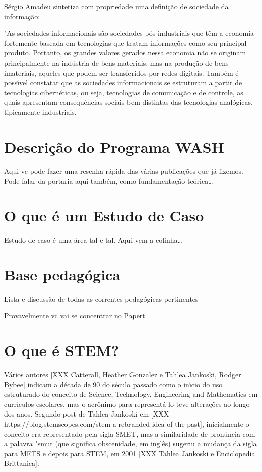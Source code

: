 \documentclass[
12pt,		%
openright,	%
twoside,  %
a4paper,			%
chapter=TITLE,		%
english,			%
french,				%
spanish,			%
brazil				%
]{USPSC-classe/USPSC}
\begin{document}
S\'ergio Amadeu sintetiza com propriedade uma defini\c{c}\~ao de sociedade da informa\c{c}\~ao: 




"As sociedades informacionais s\~ao sociedades p\'os-industriais que t\^em a economia fortemente baseada em tecnologias que tratam informa\c{c}\~oes como seu principal produto. Portanto, os grandes valores gerados nessa economia n\~ao se originam principalmente na ind\'ustria de bens materiais, mas na produ\c{c}\~ao de bens imateriais, aqueles que podem ser transferidos por redes digitais. Tamb\'em \'e poss\'{\i}vel constatar que as sociedades informacionais se estruturam a partir de tecnologias cibern\'eticas, ou seja, tecnologias de comunica\c{c}\~ao e de controle, as quais apresentam consequ\^encias sociais bem distintas das tecnologias anal\'ogicas, tipicamente industriais.
\section[Descri\c{c}\~ao do Programa WASH]{Descri\c{c}\~ao do Programa WASH}\label{Descri\c{c}\~ao do Programa WASH}
Aqui vc pode fazer uma resenha r\'apida das v\'arias publica\c{c}\~oes que j\'a fizemos. Pode falar da portaria aqui tamb\'em, como fundamenta\c{c}\~ao te\'orica… 




\section[O que \'e um Estudo de Caso]{O que \'e um Estudo de Caso}\label{O que \'e um Estudo de Caso}
Estudo de caso \'e uma \'area tal e tal. Aqui vem a colinha… 




\section[Base pedag\'ogica]{Base pedag\'ogica}\label{Base pedag\'ogica}
Lista e discuss\~ao de todas as correntes pedag\'ogicas pertinentes




Provavelmente vc vai se concentrar no Papert




\section[O que \'e STEM?]{O que \'e STEM?}\label{O que \'e STEM?}
V\'arios autores [XXX Catterall, Heather Gonzalez e  Tahlea Jankoski, Rodger Bybee] indicam a d\'ecada de 90 do s\'eculo passado como o in\'{\i}cio do uso estruturado do conceito de Science, Technology, Engineering and Mathematics em curr\'{\i}culos escolares, mas o acr\^onimo para represent\'a-lo teve altera\c{c}\~oes ao longo dos anos. Segundo post de Tahlea Jankoski em [XXX https://blog.stemscopes.com/stem-a-rebranded-idea-of-the-past], inicialmente o conceito era representado pela sigla SMET, mas a similaridade de pron\'uncia com a palavra "smut (que significa obscenidade, em ingl\^es) sugeriu a mudan\c{c}a da sigla para METS e depois para STEM, em 2001 [XXX Tahlea Jankoski e Enciclopedia Brittanica]. 
\end{document}
